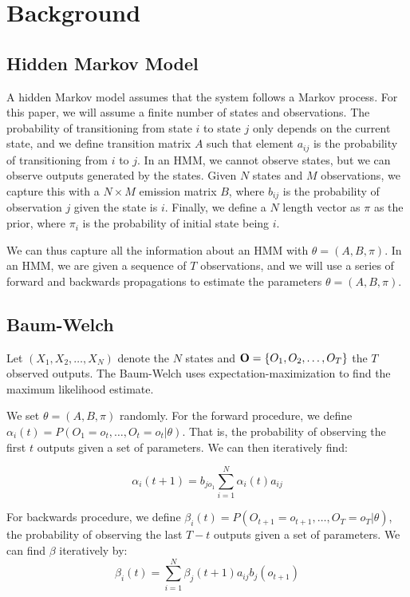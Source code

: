 \section{Background}

\subsection{Hidden Markov Model}
A hidden Markov model assumes that the system follows a Markov process. For this paper, we will assume a finite number of states and observations. The probability of transitioning from state $i$ to state $j$ only depends on the current state, and we define transition matrix $A$ such that element $a_{ij}$ is the probability  of transitioning from $i$ to $j$. In an HMM, we cannot observe states, but we can observe outputs generated by the states. Given $N$ states and $M$ observations, we capture this with a $N \times M$ emission matrix $B$, where $b_{ij}$ is the probability of observation $j$ given the state is $i$. Finally, we define a $N$ length vector as $\pi$ as the prior, where $\pi_i$ is the probability of initial state being $i$. 

We can thus capture all the information about an HMM with $\theta = (A, B, \pi)$. In an HMM, we are given a sequence of $T$ observations, and we will use a series of forward and backwards propagations to estimate the parameters $\theta = (A, B, \pi)$.

\subsection{Baum-Welch}
Let $(X_1, X_2, \ldots, X_N)$ denote the $N$ states and $\bold{O} = \{O_1, O_2, \ldots, O_T\}$ the $T$ observed outputs. The Baum-Welch uses expectation-maximization to find the maximum likelihood estimate.

We set $\theta  =  (A, B, \pi)$ randomly. For the forward procedure, we define $\alpha_i(t) = P(O_1 = o_t, \ldots, O_t = o_t | \theta)$. That is, the probability of observing the first $t$ outputs given a set of parameters. We can then iteratively find:

\begin{equation} \label{alpha}
\alpha_i(t+1) =  b_{jo_1}\sum_{i=1}^{N} \alpha_i(t)a_{ij}
\end{equation}

For backwards procedure, we define $\beta_i(t) = P(O_{t+1} = o_{t+1}, \ldots, O_T = o_T | \theta)$, the probability of observing the last $T - t$ outputs given a set of parameters. We can find $\beta$ iteratively by:
\begin{equation} \label{beta}
\beta_i(t) = \sum_{i=1}^N \beta_j(t+1)a_{ij}b_j(o_{t+1})
\end{equation}

